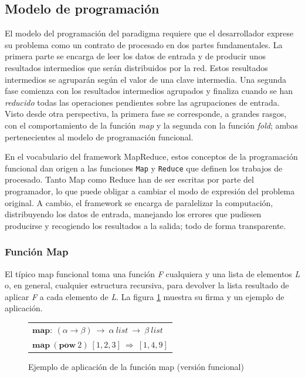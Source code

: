 \subsection{Modelo de programaci\'on}\label{subsec:programacionmapred}
\noindent El modelo del programaci\'on del paradigma requiere que el desarrollador ex\-pre\-se su problema como un contrato de procesado en dos partes fundamentales. La primera parte se encarga de leer los datos de entrada y de producir unos resultados intermedios que ser\'an distribuidos por la red. Estos resultados intermedios se agrupar\'an seg\'un el valor de una clave intermedia. Una segunda fase comienza con los resultados intermedios agrupados y finaliza cuando se han \emph{reducido} todas las operaciones pendientes sobre las agrupaciones de entrada. Visto desde otra perspectiva, la primera fase se co\-rres\-pon\-de, a grandes rasgos, con el comportamiento de la funci\'on \emph{map} y la segunda con la funci\'on \emph{fold}; ambas pertenecientes al modelo de programaci\'on funcional. \newline

En el vocabulario del framework MapReduce, estos conceptos de la programaci\'on funcional dan origen a las funciones \texttt{Map} y \texttt{Reduce} que definen los trabajos de procesado. Tanto Map como Reduce han de ser escritas por parte del programador, lo que puede obligar a cambiar el modo de expresi\'on del problema original. A cambio, el framework se encarga de paralelizar la computaci\'on, distribuyendo los datos de entrada, manejando los errores que pudiesen producirse y recogiendo los resultados a la salida; todo de forma transparente.


\subsubsection{Funci\'on Map}\label{map}
\noindent El t\'ipico map funcional toma una funci\'on \emph{F} cualquiera y una lista de elementos \emph{L} o, en general, cualquier estructura recursiva, para devolver la lista resultado de aplicar \emph{F} a cada elemento de \emph{L}. La figura \ref{fig:functionalmap} muestra su firma y un ejemplo de aplicaci\'on.\newline

\begin{figure}[tbp]
\begin{center}
\begin{tabular}{|l|}
\hline
$\mathbf{map:} \: \left ( \alpha \rightarrow \beta \right ) \: \rightarrow \: \alpha \: list \: \rightarrow \: \beta \: list$ \\
$\mathbf{map} \: \left( \mathbf{pow}\:2 \right) \: \left[ 1,2,3 \right] \: \Rightarrow \: \left[ 1,4,9 \right ]$ \\
\hline
\end{tabular}
\caption{Ejemplo de aplicaci\'on de la funci\'on map (versi\'on funcional)}
\label{fig:functionalmap}
\end{center}
\end{figure}

